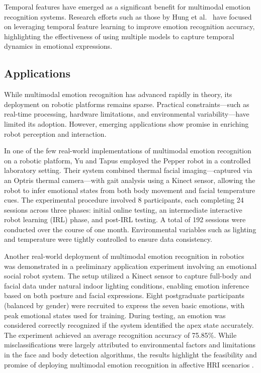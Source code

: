 Temporal features have emerged as a significant benefit for multimodal emotion recognition systems. Research efforts such as those by Hung et al.\ \cite{Hung2020-gm} have focused on leveraging temporal feature learning to improve emotion recognition accuracy, highlighting the effectiveness of using multiple models to capture temporal dynamics in emotional expressions.

\subsection{Applications}

While multimodal emotion recognition has advanced rapidly in theory, its deployment on robotic platforms remains sparse. Practical constraints—such as real-time processing, hardware limitations, and environmental variability—have limited its adoption. However, emerging applications show promise in enriching robot perception and interaction.

In one of the few real-world implementations of multimodal emotion recognition on a robotic platform, Yu and Tapus \cite{Yu2019-ku} employed the Pepper robot in a controlled laboratory setting. Their system combined thermal facial imaging—captured via an Optris thermal camera—with gait analysis using a Kinect sensor, allowing the robot to infer emotional states from both body movement and facial temperature cues. The experimental procedure involved 8 participants, each completing 24 sessions across three phases: initial online testing, an intermediate interactive robot learning (IRL) phase, and post-IRL testing. A total of 192 sessions were conducted over the course of one month. Environmental variables such as lighting and temperature were tightly controlled to ensure data consistency.

Another real-world deployment of multimodal emotion recognition in robotics was demonstrated in a preliminary application experiment involving an emotional social robot system. The setup utilized a Kinect sensor to capture full-body and facial data under natural indoor lighting conditions, enabling emotion inference based on both posture and facial expressions. Eight postgraduate participants (balanced by gender) were recruited to express the seven basic emotions, with peak emotional states used for training. During testing, an emotion was considered correctly recognized if the system identified the apex state accurately. The experiment achieved an average recognition accuracy of 75.85\%. While misclassifications were largely attributed to environmental factors and limitations in the face and body detection algorithms, the results highlight the feasibility and promise of deploying multimodal emotion recognition in affective HRI scenarios \cite{Chen2023-ss}.

